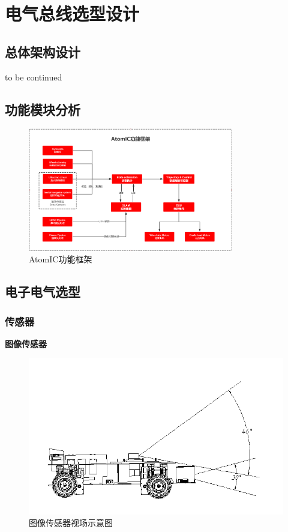 \newpage
\section{电气总线选型设计}

\subsection{总体架构设计}



to be continued

\subsection{功能模块分析}

\begin{figure}[htbp]
	\centering
	\includegraphics[width = 0.8\textwidth]{fig/rjjg.png}
	\caption{AtomIC功能框架}
	\label{wlknyy}
\end{figure}

\subsection{电子电气选型}

\subsubsection{传感器}

\textbf{图像传感器}


\begin{figure}[htbp]
	\centering
	\includegraphics[width = 1\textwidth]{fig/sjyj.png}
	\caption{图像传感器视场示意图}
	\label{sjyj}
\end{figure}


